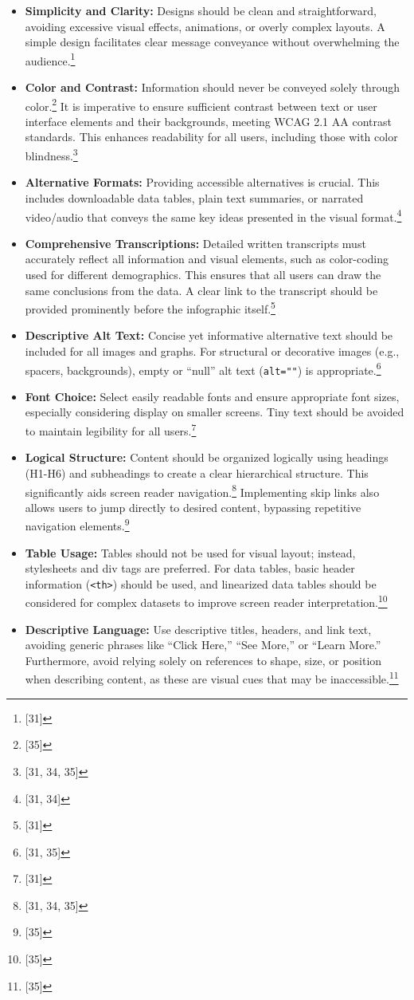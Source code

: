 \begin{itemize}
    \item \textbf{Simplicity and Clarity:} Designs should be clean and straightforward, avoiding excessive visual effects, animations, or overly complex layouts. A simple design facilitates clear message conveyance without overwhelming the audience.\footnote{[31]}
    \item \textbf{Color and Contrast:} Information should never be conveyed solely through color.\footnote{[35]} It is imperative to ensure sufficient contrast between text or user interface elements and their backgrounds, meeting WCAG 2.1 AA contrast standards. This enhances readability for all users, including those with color blindness.\footnote{[31, 34, 35]}
    \item \textbf{Alternative Formats:} Providing accessible alternatives is crucial. This includes downloadable data tables, plain text summaries, or narrated video/audio that conveys the same key ideas presented in the visual format.\footnote{[31, 34]}
    \item \textbf{Comprehensive Transcriptions:} Detailed written transcripts must accurately reflect all information and visual elements, such as color-coding used for different demographics. This ensures that all users can draw the same conclusions from the data. A clear link to the transcript should be provided prominently before the infographic itself.\footnote{[31]}
    \item \textbf{Descriptive Alt Text:} Concise yet informative alternative text should be included for all images and graphs. For structural or decorative images (e.g., spacers, backgrounds), empty or ``null'' alt text (\texttt{alt=""}) is appropriate.\footnote{[31, 35]}
    \item \textbf{Font Choice:} Select easily readable fonts and ensure appropriate font sizes, especially considering display on smaller screens. Tiny text should be avoided to maintain legibility for all users.\footnote{[31]}
    \item \textbf{Logical Structure:} Content should be organized logically using headings (H1-H6) and subheadings to create a clear hierarchical structure. This significantly aids screen reader navigation.\footnote{[31, 34, 35]} Implementing skip links also allows users to jump directly to desired content, bypassing repetitive navigation elements.\footnote{[35]}
    \item \textbf{Table Usage:} Tables should not be used for visual layout; instead, stylesheets and div tags are preferred. For data tables, basic header information (\texttt{<th>}) should be used, and linearized data tables should be considered for complex datasets to improve screen reader interpretation.\footnote{[35]}
    \item \textbf{Descriptive Language:} Use descriptive titles, headers, and link text, avoiding generic phrases like ``Click Here,'' ``See More,'' or ``Learn More.'' Furthermore, avoid relying solely on references to shape, size, or position when describing content, as these are visual cues that may be inaccessible.\footnote{[35]}
\end{itemize}

